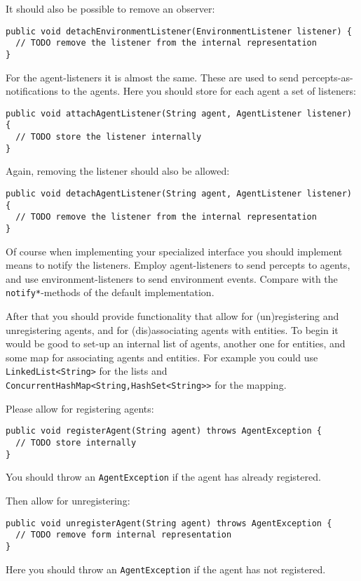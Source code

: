 \documentclass[a4]{article}
\begin{document}
It should also be possible to remove an observer:
\begin{verbatim}
public void detachEnvironmentListener(EnvironmentListener listener) {
  // TODO remove the listener from the internal representation
}
\end{verbatim}

For the agent-listeners it is almost the same. 
These are used to send percepts-as-notifications to the agents.
Here you should store for each agent a set of listeners:
\begin{verbatim}
public void attachAgentListener(String agent, AgentListener listener) {
  // TODO store the listener internally
}
\end{verbatim}

Again, removing the listener should also be allowed:
\begin{verbatim}
public void detachAgentListener(String agent, AgentListener listener) {
  // TODO remove the listener from the internal representation
}
\end{verbatim}

Of course when implementing your specialized interface you should implement means to notify the listeners.
Employ agent-listeners to send percepts to agents, and use environment-listeners to send environment events.
Compare with the \texttt{notify*}-methods of the default implementation.

After that you should provide functionality that allow for (un)registering and unregistering agents, and for
(dis)associating agents with entities. To begin it would be good to set-up an internal list of agents, another one for entities,
and some map for associating agents and entities.
For example you could use \texttt{LinkedList<String>} for the lists and \texttt{ConcurrentHashMap<String,HashSet<String>>} for the mapping.

Please allow for registering agents:
\begin{verbatim}
public void registerAgent(String agent) throws AgentException {
  // TODO store internally
}
\end{verbatim}
You should throw an \texttt{AgentException} if the agent has already registered.

Then allow for unregistering:
\begin{verbatim}
public void unregisterAgent(String agent) throws AgentException {
  // TODO remove form internal representation
}
\end{verbatim}
Here you should throw an \texttt{AgentException} if the agent has not registered.
\end{document}
